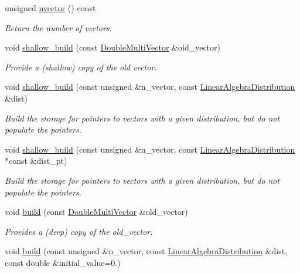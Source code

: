 \begin{DoxyCompactItemize}
unsigned \hyperlink{classoomph_1_1DoubleMultiVector_ae5d4d50a01bb6537701921e0d1a1cdff}{nvector} () const
\begin{DoxyCompactList}\small\item\em Return the number of vectors. \end{DoxyCompactList}\item 
void \hyperlink{classoomph_1_1DoubleMultiVector_a9a414941fb00967f670a1700bc87af7e}{shallow\+\_\+build} (const \hyperlink{classoomph_1_1DoubleMultiVector}{Double\+Multi\+Vector} \&old\+\_\+vector)
\begin{DoxyCompactList}\small\item\em Provide a (shallow) copy of the old vector. \end{DoxyCompactList}\item 
void \hyperlink{classoomph_1_1DoubleMultiVector_a2e870d0ff926823ec177b2c5bd1cdd0b}{shallow\+\_\+build} (const unsigned \&n\+\_\+vector, const \hyperlink{classoomph_1_1LinearAlgebraDistribution}{Linear\+Algebra\+Distribution} \&dist)
\begin{DoxyCompactList}\small\item\em Build the storage for pointers to vectors with a given distribution, but do not populate the pointers. \end{DoxyCompactList}\item 
void \hyperlink{classoomph_1_1DoubleMultiVector_acd1ee1d155838e203a95fc70cdc1552c}{shallow\+\_\+build} (const unsigned \&n\+\_\+vector, const \hyperlink{classoomph_1_1LinearAlgebraDistribution}{Linear\+Algebra\+Distribution} $\ast$const \&dist\+\_\+pt)
\begin{DoxyCompactList}\small\item\em Build the storage for pointers to vectors with a given distribution, but do not populate the pointers. \end{DoxyCompactList}\item 
void \hyperlink{classoomph_1_1DoubleMultiVector_aff18cf0f4bf61f034b99a1542b60414b}{build} (const \hyperlink{classoomph_1_1DoubleMultiVector}{Double\+Multi\+Vector} \&old\+\_\+vector)
\begin{DoxyCompactList}\small\item\em Provides a (deep) copy of the old\+\_\+vector. \end{DoxyCompactList}\item 
void \hyperlink{classoomph_1_1DoubleMultiVector_a77d4b7b0d647f08995f6197843608fc2}{build} (const unsigned \&n\+\_\+vector, const \hyperlink{classoomph_1_1LinearAlgebraDistribution}{Linear\+Algebra\+Distribution} \&dist, const double \&initial\+\_\+value=0.)

\end{DoxyCompactItemize}
